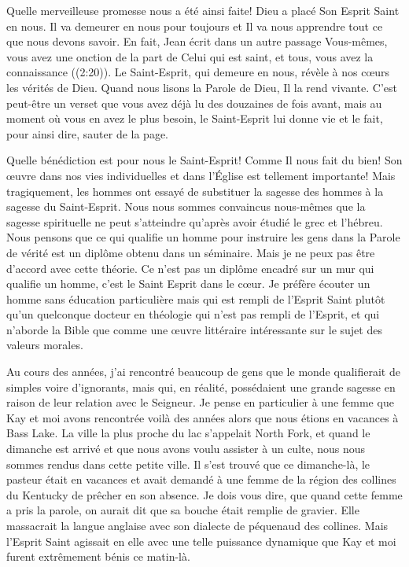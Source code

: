 Quelle merveilleuse promesse nous a été ainsi faite! Dieu a placé Son Esprit
 Saint en nous. Il va demeurer en nous pour toujours \ocadr et Il va nous
 apprendre tout ce que nous devons savoir. En fait, Jean écrit dans un autre
 passage\frcolon{}
 \Og Vous-mêmes, vous avez une onction de la part de Celui qui est saint,
 et tous, vous avez la connaissance \Fg{} ((2:20)).
 Le Saint-Esprit, qui demeure en nous, révèle à nos c\oe{}urs les vérités de Dieu.
 Quand nous lisons la Parole de Dieu, Il la rend vivante.
 C'est peut-être un verset que vous avez déjà lu des douzaines de fois avant,
 mais au moment où vous en avez le plus besoin, le Saint-Esprit lui donne vie
 et le fait, pour ainsi dire, sauter de la page.
 
Quelle bénédiction est pour nous le Saint-Esprit!
 Comme Il nous fait du bien! Son \oe{}uvre dans nos vies individuelles et dans
 l'Église est tellement importante! Mais tragiquement, les hommes ont essayé de
 substituer la sagesse des hommes à la sagesse du Saint-Esprit.
 Nous nous sommes convaincus nous-mêmes que la sagesse spirituelle ne peut
 s'atteindre qu'après avoir étudié le grec et l'hébreu. Nous pensons que ce qui
 qualifie un homme pour instruire les gens dans la Parole de vérité est
 un diplôme obtenu dans un séminaire.
 Mais je ne peux pas être d'accord avec cette théorie.
 Ce n'est pas un diplôme encadré sur un mur qui qualifie un homme,
 c'est le Saint Esprit dans le c\oe{}ur.
 Je préfère écouter un homme sans éducation particulière mais
 qui est rempli de l'Esprit Saint plutôt qu'un quelconque docteur
 en théologie qui n'est pas rempli de l'Esprit,
 et qui n'aborde la Bible que comme une \oe{}uvre littéraire intéressante
 sur le sujet des valeurs morales. 

Au cours des années, j'ai rencontré beaucoup de gens que le monde
 qualifierait de simples voire d'ignorants, mais qui, en réalité,
 possédaient une grande sagesse en raison de leur relation avec le Seigneur.
 Je pense en particulier à une femme que Kay et moi avons rencontrée
 voilà des années alors que nous étions en vacances à Bass Lake.
 La ville la plus proche du lac s'appelait North Fork, et quand le dimanche
 est arrivé et que nous avons voulu assister à un culte,
 nous nous sommes rendus dans cette petite ville. Il s'est trouvé que ce
 dimanche-là, le pasteur était en vacances et avait demandé
 à une femme de la région des collines du Kentucky de 
 prêcher en son absence.
 Je dois vous dire, que quand cette femme a pris la parole, on aurait dit
 que sa bouche était remplie de gravier. Elle massacrait la langue anglaise
 avec son dialecte de péquenaud des collines.
 Mais l'Esprit Saint agissait en elle avec une telle puissance dynamique
 que Kay et moi furent extrêmement bénis ce matin-là.

